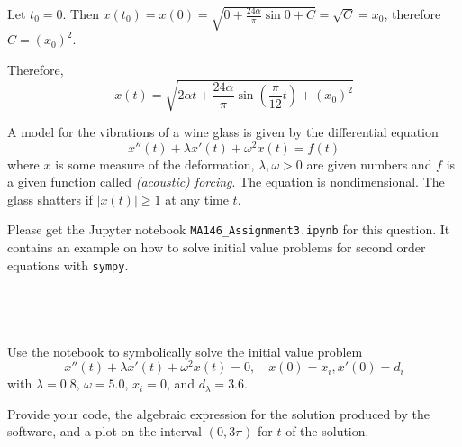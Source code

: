 \documentclass[a4paper]{article}
\begin{document}
Let $t_0 = 0$. Then $x(t_0) = x(0) = \sqrt{0 + \frac{24 \alpha}{\pi} \sin 0 + C} = \sqrt{C} = x_0$, therefore $C = {(x_0)}^2$.

Therefore, \[ x(t) = \sqrt{2\alpha t + \frac{24\alpha}{\pi} \sin \left(\frac{\pi}{12} t\right) + {(x_0)}^2} \]


\begin{questionbody}
A model for the vibrations of a wine glass is given by the differential equation \begin{equation}\label{eqn:Q3-vibrations-ode}
x''(t) + \lambda x'(t) + \omega^2 x(t) = f(t)
\end{equation}
where $x$ is some measure of the deformation, $\lambda, \omega > 0$ are given numbers and $f$ is a given function called \textit{(acoustic) forcing}. The equation is nondimensional. The glass shatters if $|x(t)| \ge 1$ at any time $t$.

Please get the Jupyter notebook \texttt{MA146\_Assignment3.ipynb} for this question. It contains an example on how to solve initial value problems for second order equations with \texttt{sympy}.
\end{questionbody}

\subsection{~} %

\begin{questionbody}
Use the notebook to symbolically solve the initial value problem \[
x''(t) + \lambda x'(t) + \omega^2 x(t) = 0, \quad x(0) = x_i, x'(0) = d_i
\] with $\lambda = 0.8$, $\omega = 5.0$, $x_i = 0$, and $d_λ = 3.6$.

Provide your code, the algebraic expression for the solution produced by the software, and a plot on the interval $(0, 3\pi)$ for $t$ of the solution.
\end{questionbody}
\end{document}
